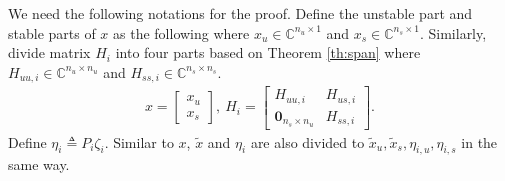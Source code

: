 \documentclass[12pt]{article}  %
\newcommand{\Cb}{{\mathbb{C}}}
\begin{document}
We need the following notations for the proof.
Define the unstable part and stable parts of $x$ as the following where $x_u\in\Cb^{n_u\times 1}$ and $x_s\in\Cb^{n_s\times 1}$. Similarly, divide matrix $H_i$ into four parts based on Theorem \ref{th:span} where $H_{uu,i}\in\Cb^{n_u\times n_u}$ and $H_{ss,i}\in\Cb^{n_s\times n_s}$.
\begin{align*}
x = 
\left[
\begin{array}{c}
x_u\\x_s
\end{array}
\right],\
	H_i=\begin{bmatrix}
H_{uu,i}	& 	H_{us,i} \\
\mathbf{0}_{n_s\times n_u} & H_{ss,i}
\end{bmatrix} .
\end{align*}
Define $\eta_{i}\triangleq P_i\zeta_{i}$.
Similar to $x$, $\tilde{x}$ and $\eta_i$ are also divided to $\tilde{x}_u,\tilde{x}_s,\eta_{i,u},\eta_{i,s}$ in the same way.
\end{document}
